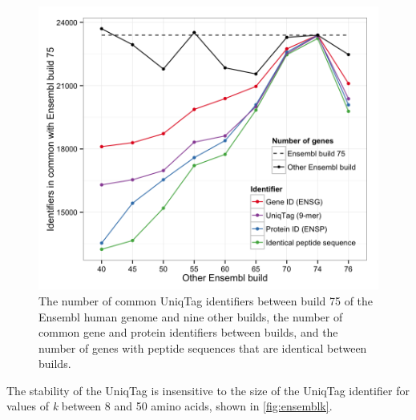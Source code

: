 \documentclass[
  12pt,
  oneside,
  openany]{book}
\begin{document}
\begin{figure}
\hypertarget{fig:ensembl}{%
\centering
\includegraphics{uniqtag/ensembl.png}
\caption[The number of common UniqTag identifiers between build 75 of the Ensembl human genome and nine other builds, the number of common gene and protein identifiers between builds, and the number of genes with peptide sequences that are identical between builds.]{The number of common UniqTag identifiers between build 75 of the Ensembl human genome and nine other builds, the number of common gene and protein identifiers between builds, and the number of genes with peptide sequences that are identical between builds.}\label{fig:ensembl}
}
\end{figure}

The stability of the UniqTag is insensitive to the size of the UniqTag identifier for values of \emph{k} between 8 and 50 amino acids, shown in \cref{fig:ensemblk}.
\end{document}
